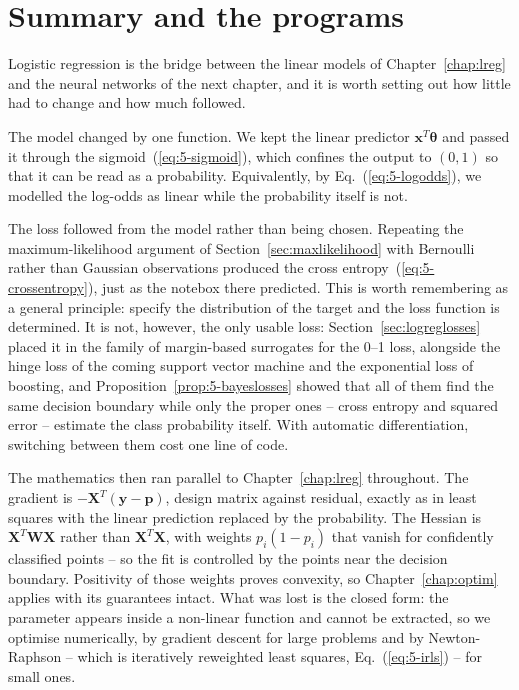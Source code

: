 \section{Summary and the programs}
\label{sec:ch5summary}

Logistic regression is the bridge between the linear models of
Chapter~\ref{chap:lreg} and the neural networks of the next chapter, and it is
worth setting out how little had to change and how much followed.

The model changed by one function.  We kept the linear predictor
$\bm{x}^{T}\bm{\theta}$ and passed it through the sigmoid~(\ref{eq:5-sigmoid}),
which confines the output to $(0,1)$ so that it can be read as a probability.
Equivalently, by Eq.~(\ref{eq:5-logodds}), we modelled the log-odds as linear
while the probability itself is not.

The loss followed from the model rather than being chosen.  Repeating the
maximum-likelihood argument of Section~\ref{sec:maxlikelihood} with Bernoulli
rather than Gaussian observations produced the cross
entropy~(\ref{eq:5-crossentropy}), just as the notebox there predicted.  This
is worth remembering as a general principle: specify the distribution of the
target and the loss function is determined.  It is not, however, the only
usable loss: Section~\ref{sec:logreglosses} placed it in the family of
margin-based surrogates for the 0--1 loss, alongside the hinge loss of the
coming support vector machine and the exponential loss of boosting, and
Proposition~\ref{prop:5-bayeslosses} showed that all of them find the same
decision boundary while only the proper ones -- cross entropy and squared
error -- estimate the class probability itself.  With automatic
differentiation, switching between them cost one line of code.

The mathematics then ran parallel to Chapter~\ref{chap:lreg} throughout.  The
gradient is $-\bm{X}^{T}(\bm{y}-\bm{p})$, design matrix against residual,
exactly as in least squares with the linear prediction replaced by the
probability.  The Hessian is $\bm{X}^{T}\bm{W}\bm{X}$ rather than
$\bm{X}^{T}\bm{X}$, with weights $p_i(1-p_i)$ that vanish for confidently
classified points -- so the fit is controlled by the points near the decision
boundary.  Positivity of those weights proves convexity, so
Chapter~\ref{chap:optim} applies with its guarantees intact.  What was lost is
the closed form: the parameter appears inside a non-linear function and cannot
be extracted, so we optimise numerically, by gradient descent for large
problems and by Newton-Raphson -- which is iteratively reweighted least
squares, Eq.~(\ref{eq:5-irls}) -- for small ones.

